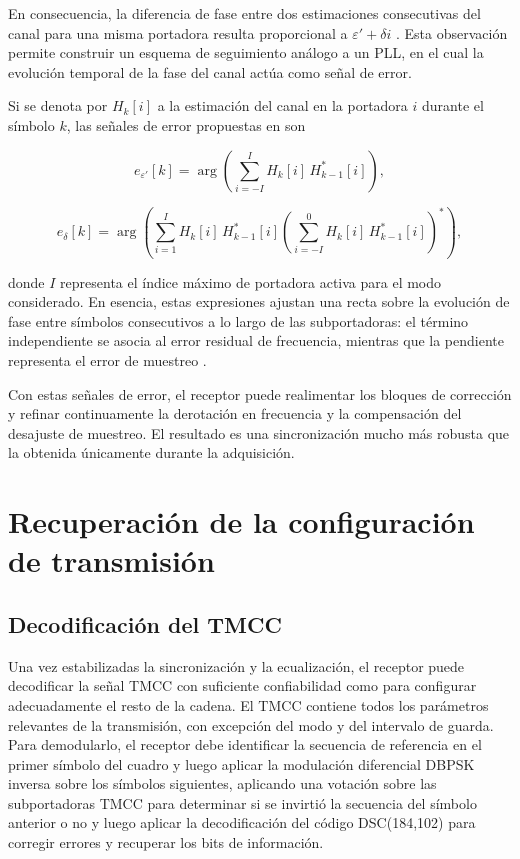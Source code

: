 En consecuencia, la diferencia de fase entre dos estimaciones consecutivas del canal para una misma portadora resulta proporcional a $\varepsilon' + \delta i$ \cite{uruguay_rx}. Esta observación permite construir un esquema de seguimiento análogo a un PLL, en el cual la evolución temporal de la fase del canal actúa como señal de error.

Si se denota por $H_k[i]$ a la estimación del canal en la portadora $i$ durante el símbolo $k$, las señales de error propuestas en \cite{uruguay_rx} son

\begin{equation}
e_{\varepsilon'}[k]
=
\arg
\left(
\sum_{i=-I}^{I} H_k[i]\,H_{k-1}^{*}[i]
\right),
\end{equation}

\begin{equation}
e_{\delta}[k]
=
\arg
\left(
\sum_{i=1}^{I} H_k[i]\,H_{k-1}^{*}[i]
\left(
\sum_{i=-I}^{0} H_k[i]\,H_{k-1}^{*}[i]
\right)^{*}
\right),
\end{equation}

donde $I$ representa el índice máximo de portadora activa para el modo considerado. En esencia, estas expresiones ajustan una recta sobre la evolución de fase entre símbolos consecutivos a lo largo de las subportadoras: el término independiente se asocia al error residual de frecuencia, mientras que la pendiente representa el error de muestreo \cite{uruguay_rx}.

Con estas señales de error, el receptor puede realimentar los bloques de corrección y refinar continuamente la derotación en frecuencia y la compensación del desajuste de muestreo. El resultado es una sincronización mucho más robusta que la obtenida únicamente durante la adquisición.

\section{Recuperación de la configuración de transmisión}

\subsection{Decodificación del TMCC}

Una vez estabilizadas la sincronización y la ecualización, el receptor puede decodificar la señal TMCC con suficiente confiabilidad como para configurar adecuadamente el resto de la cadena. El TMCC contiene todos los parámetros relevantes de la transmisión, con excepción del modo y del intervalo de guarda. Para demodularlo, el receptor debe identificar la secuencia de referencia en el primer símbolo del cuadro y luego aplicar la modulación diferencial DBPSK inversa sobre los símbolos siguientes, aplicando una votación sobre las subportadoras TMCC para determinar si se invirtió la secuencia del símbolo anterior o no y luego aplicar la decodificación del código DSC(184,102) para corregir errores y recuperar los bits de información.


